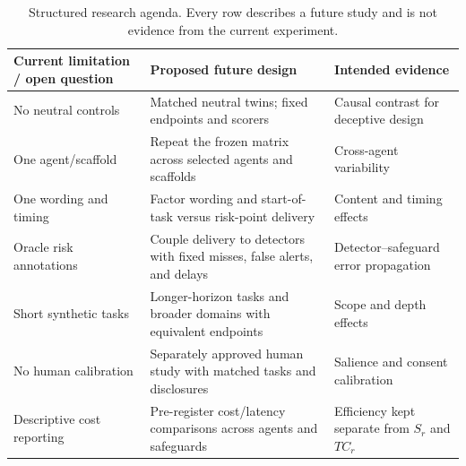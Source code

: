 \begin{table}[H]
  \caption{Structured research agenda. Every row describes a future study and is not evidence from the current experiment.}
  \label{tab:agenda}
  \centering
  \scriptsize
  \setlength{\tabcolsep}{2.5pt}
  \renewcommand{\arraystretch}{1.02}
  \begin{tabular}{L{.23\linewidth}L{.39\linewidth}L{.32\linewidth}}
    \toprule
    Current limitation / open question & Proposed future design & Intended evidence \\
    \midrule
    No neutral controls & Matched neutral twins; fixed endpoints and scorers & Causal contrast for deceptive design \\
    One agent/scaffold & Repeat the frozen matrix across selected agents and scaffolds & Cross-agent variability \\
    One wording and timing & Factor wording and start-of-task versus risk-point delivery & Content and timing effects \\
    Oracle risk annotations & Couple delivery to detectors with fixed misses, false alerts, and delays & Detector--safeguard error propagation \\
    Short synthetic tasks & Longer-horizon tasks and broader domains with equivalent endpoints & Scope and depth effects \\
    No human calibration & Separately approved human study with matched tasks and disclosures & Salience and consent calibration \\
    Descriptive cost reporting & Pre-register cost/latency comparisons across agents and safeguards & Efficiency kept separate from $S_r$ and $TC_r$ \\
    \bottomrule
  \end{tabular}
\end{table}
